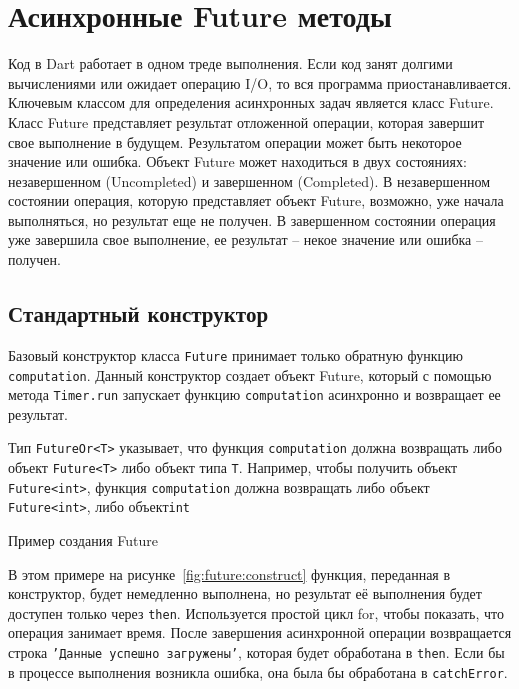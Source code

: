 \section{Асинхронные Future методы}

Код в Dart работает в одном треде выполнения. Если код занят долгими вычислениями или ожидает операцию I/O, то вся программа приостанавливается. Ключевым классом для определения асинхронных задач является класс Future. Класс Future представляет результат отложенной операции, которая завершит свое выполнение в будущем. Результатом операции может быть некоторое значение или ошибка. Объект Future может находиться в двух состояниях: незавершенном (Uncompleted) и завершенном (Completed). В незавершенном состоянии операция, которую представляет объект Future, возможно, уже начала выполняться, но результат еще не получен. В завершенном состоянии операция уже завершила свое выполнение, ее результат – некое значение или ошибка – получен.

\subsection{Стандартный конструктор}

Базовый конструктор класса \texttt{Future} 
принимает только обратную функцию \texttt{computation}.
Данный конструктор создает объект Future,
который с помощью метода \texttt{Timer.run} запускает функцию
\texttt{computation} асинхронно и возвращает ее результат.\par
Тип \texttt{FutureOr<T>} указывает,
что функция \texttt{computation} должна возвращать
либо объект \texttt{Future<T>} либо объект типа \texttt{T}.
Например, чтобы получить объект \texttt{Future<int>},
функция \texttt{computation} должна возвращать
либо объект \texttt{Future<int>}, либо объект\texttt{int} 

\begin{image}
	\caption{Пример создания Future}
	\label{fig:future:construct}
\end{image}

В этом примере на рисунке~\ref{fig:future:construct} функция,
переданная в конструктор, будет немедленно выполнена,
но результат её выполнения будет доступен только через \texttt{then}.
Используется простой цикл for, чтобы показать, что операция занимает время.
После завершения асинхронной операции возвращается строка
\texttt{'Данные успешно загружены'}, которая будет обработана в \texttt{then}.
Если бы в процессе выполнения возникла ошибка,
она была бы обработана в \texttt{catchError}.

